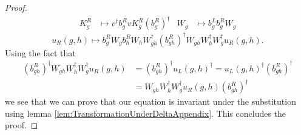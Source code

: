 \documentclass[11pt,a4paper,twoside]{article}
\numberwithin{equation}{section}
\begin{document}
\begin{proof}
		\begin{align}
			K_g^R&\mapsto v^\dagger b_g^R v K_g^R (b_g^R)^\dagger&W_g&\mapsto b_g^Lb_g^RW_g
		\end{align}
		\begin{equation}
			u_R(g,h)\mapsto b_g^R W_g b_h^R W_h W_{gh}^\dagger (b_{gh}^R)^\dagger W_{gh}W_h^\dagger W_g^\dagger u_R(g,h).
		\end{equation}
		Using the fact that
		\begin{align}
			(b_{gh}^R)^\dagger W_{gh}W_h^\dagger W_g^\dagger u_R(g,h)&=(b_{gh}^R)^\dagger u_L(g,h)^\dagger=u_L(g,h)^\dagger(b_{gh}^R)^\dagger\\
			&=W_{gh}W_h^\dagger W_g^\dagger u_R(g,h) (b_{gh}^R)^\dagger
		\end{align}
		we see that we can prove that our equation is invariant under the substitution using lemma \ref{lem:TransformationUnderDeltaAppendix}. This concludes the proof.
	\end{proof}
\end{document}
